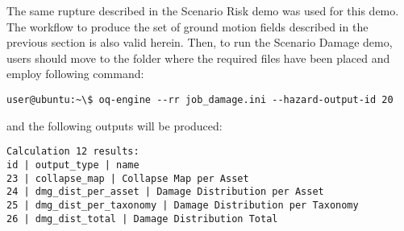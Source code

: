 The same rupture described in the Scenario Risk demo was used for this demo.
The workflow to produce the set of ground motion fields described in the
previous section is also valid herein. Then, to run the Scenario Damage demo,
users should move to the folder where the required files have been placed and
employ following command:

\begin{Verbatim}[frame=single, commandchars=\\\{\}, samepage=true]
user@ubuntu:~\$ oq-engine --rr job_damage.ini --hazard-output-id 20
\end{Verbatim}

and the following outputs will be produced:

\begin{Verbatim}[frame=single, commandchars=\\\{\}, samepage=true]
Calculation 12 results:
id | output_type | name
23 | collapse_map | Collapse Map per Asset
24 | dmg_dist_per_asset | Damage Distribution per Asset
25 | dmg_dist_per_taxonomy | Damage Distribution per Taxonomy
26 | dmg_dist_total | Damage Distribution Total
\end{Verbatim}